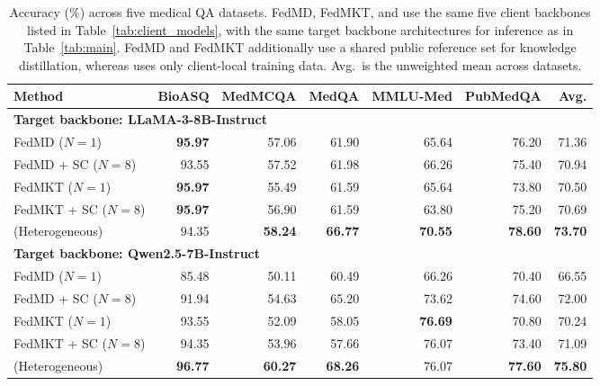 \begin{table}[!t]
\centering\small
\setlength{\tabcolsep}{3.7pt}
\begin{tabular}{lrrrrrr}
\toprule
Method & BioASQ & MedMCQA & MedQA & MMLU-Med & PubMedQA & Avg. \\
\midrule
\multicolumn{7}{l}{\textbf{Target backbone: LLaMA-3-8B-Instruct}} \\
FedMD ($N=1$) & \textbf{95.97} & 57.06 & 61.90 & 65.64 & 76.20 & 71.36 \\
FedMD + SC ($N=8$) & 93.55 & 57.52 & 61.98 & 66.26 & 75.40 & 70.94 \\
FedMKT ($N=1$) & \textbf{95.97} & 55.49 & 61.59 & 65.64 & 73.80 & 70.50 \\
FedMKT + SC ($N=8$) & \textbf{95.97} & 56.90 & 61.59 & 63.80 & 75.20 & 70.69 \\
\rowcolor{oursrow} \ours{} (Heterogeneous) & 94.35 & \textbf{58.24} & \textbf{66.77} & \textbf{70.55} & \textbf{78.60} & \textbf{73.70} \\
\midrule
\multicolumn{7}{l}{\textbf{Target backbone: Qwen2.5-7B-Instruct}} \\
FedMD ($N=1$) & 85.48 & 50.11 & 60.49 & 66.26 & 70.40 & 66.55 \\
FedMD + SC ($N=8$) & 91.94 & 54.63 & 65.20 & 73.62 & 74.60 & 72.00 \\
FedMKT ($N=1$) & 93.55 & 52.09 & 58.05 & \textbf{76.69} & 70.80 & 70.24 \\
FedMKT + SC ($N=8$) & 94.35 & 53.96 & 57.66 & 76.07 & 73.40 & 71.09 \\
\rowcolor{oursrow} \ours{} (Heterogeneous) & \textbf{96.77} & \textbf{60.27} & \textbf{68.26} & 76.07 & \textbf{77.60} & \textbf{75.80} \\
\bottomrule
\end{tabular}
\caption{Accuracy (\%) across five medical QA datasets. FedMD, FedMKT, and \ours{} use the same five client backbones listed in Table~\ref{tab:client_models}, with the same target backbone architectures for inference as in Table~\ref{tab:main}. FedMD and FedMKT additionally use a shared public reference set for knowledge distillation, whereas \ours{} uses only client-local training data. Avg.\ is the unweighted mean across datasets.}
\label{tab:model_heterogeneous}
\end{table}
